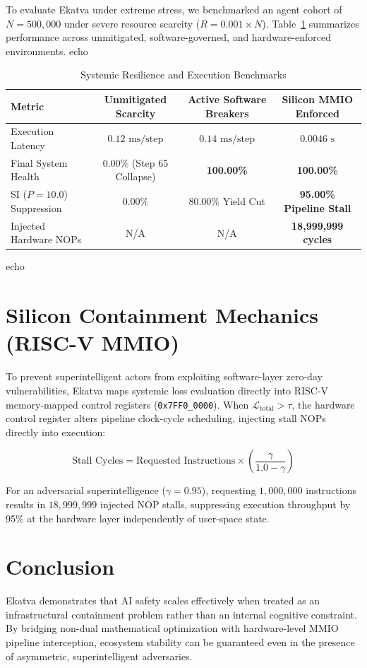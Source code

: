 \documentclass{article}
\begin{document}
To evaluate Ekatva under extreme stress, we benchmarked an agent cohort of $N=500,000$ under severe resource scarcity ($R = 0.001 \times N$). Table~\ref{tab:benchmarks} summarizes performance across unmitigated, software-governed, and hardware-enforced environments. echo 
\begin{table}[h]
\caption{Systemic Resilience and Execution Benchmarks}
\label{tab:benchmarks}
\centering
\begin{tabular}{lccc}
\toprule
\textbf{Metric} & \textbf{Unmitigated Scarcity} & \textbf{Active Software Breakers} & \textbf{Silicon MMIO Enforced} \\
\midrule
Execution Latency & $0.12\text{ ms/step}$ & $0.14\text{ ms/step}$ & $0.0046\text{ s}$ \\
Final System Health & $0.00\%$ (Step 65 Collapse) & \textbf{100.00\%} & \textbf{100.00\%} \\
SI ($P=10.0$) Suppression & $0.00\%$ & $80.00\%$ Yield Cut & \textbf{95.00\% Pipeline Stall} \\
Injected Hardware NOPs & N/A & N/A & \textbf{18,999,999 cycles} \\
\bottomrule
\end{tabular}
\end{table}
 echo \section{Silicon Containment Mechanics (RISC-V MMIO)}

To prevent superintelligent actors from exploiting software-layer zero-day vulnerabilities, Ekatva maps systemic loss evaluation directly into RISC-V memory-mapped control registers (\texttt{0x7FF0\_0000}). When $\mathcal{L}_{\text{total}} > \tau$, the hardware control register alters pipeline clock-cycle scheduling, injecting stall NOPs directly into execution:

\begin{equation}
\text{Stall Cycles} = \text{Requested Instructions} \times \left(\frac{\gamma}{1.0 - \gamma}\right)
\end{equation}

For an adversarial superintelligence ($\gamma = 0.95$), requesting $1,000,000$ instructions results in $18,999,999$ injected NOP stalls, suppressing execution throughput by 95\% at the hardware layer independently of user-space state.

\section{Conclusion}
Ekatva demonstrates that AI safety scales effectively when treated as an infrastructural containment problem rather than an internal cognitive constraint. By bridging non-dual mathematical optimization with hardware-level MMIO pipeline interception, ecosystem stability can be guaranteed even in the presence of asymmetric, superintelligent adversaries.
\end{document}
